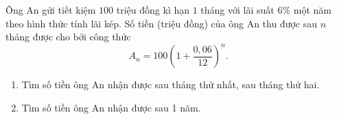 \begin{bt}%
	Ông An gửi tiết kiệm $100$ triệu đồng kì hạn $1$ tháng với lãi suất $6 \%$ một năm theo hình thức tính lãi kép.  Số tiền (triệu đồng) của ông An thu được sau $n$ tháng được cho bởi công thức
	$$ 
	 A_n=100\left(1+\dfrac{0{,}06}{12}\right)^n .
	$$ 
	\begin{enumerate}
		\item Tìm số tiền ông An nhận được sau  tháng thứ nhất, sau tháng thứ hai.
		\item Tìm  số tiền ông An nhận được sau 1 năm.
	\end{enumerate}
\end{bt}

